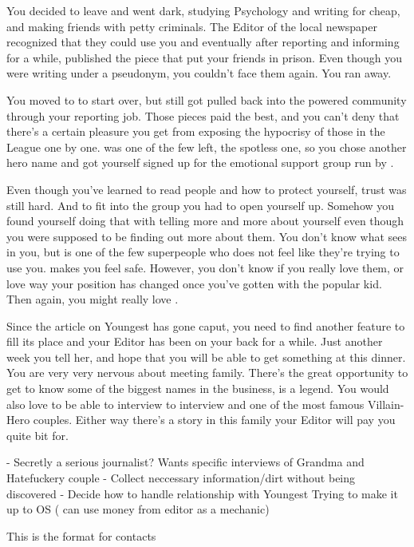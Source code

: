 \documentclass[char]{LRSguildcamp1}
\begin{document}
You decided to leave and went dark, studying Psychology and writing for cheap, and making friends with petty criminals. The Editor of the local newspaper recognized that they could use you and eventually after reporting and informing for a while, published the piece that put your friends in prison. Even though you were writing under a pseudonym, you couldn't face them again. You ran away. 

You moved to \pCityY{} to start over, but still got pulled back into the powered community through your reporting job. Those pieces paid the best, and you can't deny that there's a certain pleasure you get from exposing the hypocrisy of those in the League one by one. \cYoungest{} was one of the few left, the spotless one, so you chose another hero name and got yourself signed up for the emotional support group run by \cYoungest{}. 

Even though you've learned to read people and how to protect yourself, trust was still hard. And to fit into the group you had to open yourself up. Somehow you found yourself doing that with \cYoungest{} telling \cYoungest{} more and more about yourself even though you were supposed to be finding out more about them. You don't know what \cYoungest{} sees in you, but \cYoungest{} is one of the few superpeople who does not feel like they're trying to use you. \cYoungest{} makes you feel safe. However, you don't know if you really love them, or love way your position has changed once you've gotten with the popular kid. Then again, you might really love \cYoungest{}. 

Since the article on Youngest has gone caput, you need to find another feature to fill its place and your Editor has been on your back for a while. Just another week you tell her, and hope that you will be able to get something at this dinner. You are very very nervous about meeting \cYoungest{} family. There’s the great opportunity to get to know some of the biggest names in the business, \cGrandma{} is a legend. You would also love to be able to interview to interview \cOldest and \cOS one of the most famous Villain-Hero couples. Either way there's a story in this family your Editor will pay you quite bit for. 




\begin{itemz}[Goals]
	\item 
\end{itemz}

\begin{itemz}[Notes]
	\item 
	- Secretly a serious journalist?  Wants specific interviews of Grandma and Hatefuckery couple 
	- Collect neccessary information/dirt without being discovered
	- Decide how to handle relationship with Youngest 
	Trying to make it up to OS ( can use money from editor as a mechanic)
	
\end{itemz}

\begin{contacts}
	\contact{} This is the format for contacts 
\end{contacts}
\end{document}
